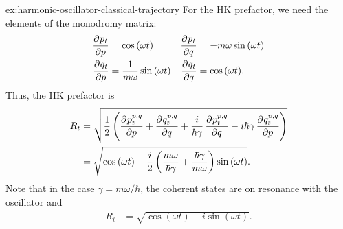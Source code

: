 \begin{DefAnswer}{ex:harmonic-oscillator-classical-trajectory}
	For the HK prefactor, we need the elements of the monodromy matrix:
	\begin{subequations}
	\begin{align}
		\dpd{p_t}{p}
		&= \cos{(\omega t)}
		&
		\dpd{p_t}{q}
		&= -m \omega \sin{(\omega t)} \\
		\dpd{q_t}{p}
		&= \frac{1}{m \omega} \sin{(\omega t)}
		&
		\dpd{q_t}{q}
		&= \cos{(\omega t)}.
	\end{align}
	\end{subequations}
	Thus, the HK prefactor is
	\begin{subequations}
	\begin{align}
		R_t
		&= \sqrt{\frac{1}{2} \left(
				\dpd{p\coh{p}{q}_t}{p}
				+ \dpd{q\coh{p}{q}_t}{q}
				+ \frac{i}{\hbar \gamma} \dpd{p\coh{p}{q}_t}{q}
				- i \hbar \gamma \dpd{q\coh{p}{q}_t}{p}
			\right)} \\
		&= \sqrt{
				\cos{(\omega t)}
				- \frac{i}{2} \left( \frac{m \omega}{\hbar \gamma} + \frac{\hbar \gamma}{m \omega} \right) \sin{(\omega t)}
			}.
	\end{align}
	\end{subequations}
	Note that in the case $\gamma = m \omega / \hbar$, the coherent states are on resonance with the oscillator and
	\begin{align}
		R_t
		&= \sqrt{\cos{(\omega t)} - i \sin{(\omega t)}}.
	\end{align}
\end{DefAnswer}
